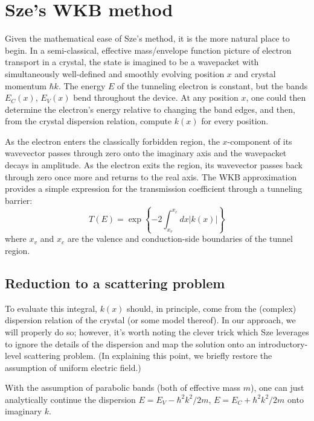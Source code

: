 \section{Sze's WKB method}
Given the mathematical ease of Sze's method, it is the more natural place to begin.  In a semi-classical, effective mass/envelope function picture of electron transport in a crystal, the state is imagined to be a wavepacket with simultaneously well-defined and smoothly evolving position $x$ and crystal momentum $\hbar k$.  The energy $E$ of the tunneling electron is constant, but the bands $E_C(x)$, $E_V(x)$ bend throughout the device.  At any position $x$, one could then determine the electron's energy relative to changing the band edges, and then, from the crystal dispersion relation, compute $k(x)$ for every position.

As the electron enters the classically forbidden region, the $x$-component of its wavevector passes through zero onto the imaginary axis and the wavepacket decays in amplitude.  As the electron exits the region, its wavevector passes back through zero once more and returns to the real axis.  The WKB approximation provides a simple expression for the transmission coefficient through a tunneling barrier:
$$T(E)=\exp\left\{-2\int_{x_v}^{x_c}dx|k(x)|\right\}$$
where $x_v$ and $x_c$ are the valence and conduction-side boundaries of the tunnel region.
\subsection{Reduction to a scattering problem}
To evaluate this integral, $k(x)$ should, in principle, come from the (complex) dispersion relation of the crystal (or some model thereof).  In our approach, we will properly do so; however, it's worth noting the clever trick which Sze leverages to ignore the details of the dispersion and map the solution onto an introductory-level scattering problem.  (In explaining this point, we briefly restore the assumption of uniform electric field.)

With the assumption of parabolic bands (both of effective mass $m$), one can just analytically continue the dispersion $E=E_V-\hbar^2k^2/2m$, $E=E_C+\hbar^2k^2/2m$ onto imaginary $k$.